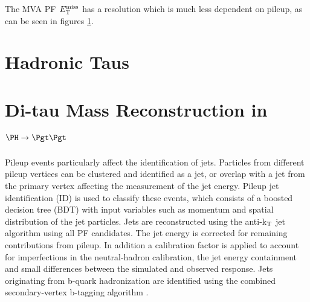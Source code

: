 The MVA PF $E_{\mathrm{T}}^{\text{miss}}$ has a resolution which is much less
dependent on pileup, as can be seen in figures \ref{fig:mvamet}.

\begin{figure}
\begin{center}
\end{center}
\caption{
}
\label{fig:mvamet}
\end{figure}

\section{Hadronic Taus}
\label{sec:taus}

\section{Di-tau Mass Reconstruction in $\PH \to \Pgt\Pgt$}
\label{sec:svfit}


Pileup events particularly affect the identification of jets. Particles from
different pileup vertices can be clustered and identified as a jet, or overlap
with a jet from the primary vertex affecting the measurement of the jet energy.
Pileup jet identification (ID) is used to classify these events, which consists
of a boosted decision tree (BDT) \cite{TMVA} with input variables such as
momentum and spatial distribution of the jet particles. Jets are reconstructed
using the anti-k$_{\rm{T}}$ jet algorithm \cite{antikt} using all PF candidates.
The jet energy is corrected for remaining contributions from pileup. In addition
a calibration factor is applied to account for imperfections in the
neutral-hadron calibration, the jet energy containment and small differences
between the simulated and observed response. Jets originating from b-quark
hadronization are identified using the combined secondary-vertex b-tagging
algorithm \cite{bjets}.


